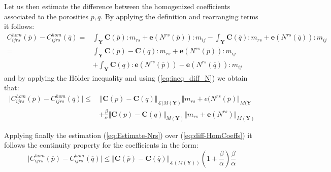 Let us then estimate the difference between the homogenized coefficients associated to the porosities $\overline{p},\overline{q}$. By applying the definition and rearranging terms it follows:
\begin{equation*}
    \begin{aligned}
        C^{hom}_{ijrs}(\overline{p}) - C^{hom}_{ijrs}(\overline{q}) = & \int_{\mathbf{Y}} \mathbf{C}(\overline{p}):m_{rs} + \mathbf{e}(N^{rs}(\overline{p})):m_{ij} - \int_{\mathbf{Y}} \mathbf{C}(\overline{q}):m_{rs} + \mathbf{e}(N^{rs}(\overline{q})):m_{ij}\\
        = & \int_{\mathbf{Y}} \mathbf{C}(\overline{p}) - \mathbf{C}(\overline{q}):m_{rs} + \mathbf{e}(N^{rs}(\overline{p})):m_{ij} \\
        & + \int_{\mathbf{Y}} \mathbf{C}(q):\mathbf{e}(N^{rs}(\overline{p})) - \mathbf{e}(N^{rs}(\overline{q})):m_{ij} 
    \end{aligned}
\end{equation*}
and by applying the H\"{o}lder inequality and using (\ref{eq:ineq_diff_N}) we obtain that:
\begin{equation}
    \label{eq:diff-HomCoeffs}
    \begin{aligned}
        \vert C^{hom}_{ijrs}(\overline{p}) - C^{hom}_{ijrs}(\overline{q})\vert \leq & \, \Vert \mathbf{C}(p)-\mathbf{C}(q) \Vert_{\mathcal{L}(M(\mathbf{Y})} \Vert m_{rs}+e(N^{rs}(\overline{p}) \Vert_{M(\mathbf{Y}} \\
         & +  \frac{\beta}{\alpha} \Vert \mathbf{C}(p)-\mathbf{C}(q) \Vert_{M(\mathbf{Y})} \Vert m_{rs}+\mathbf{e}(N^{rs}) \Vert_{M(\mathbf{Y})} 
    \end{aligned}
\end{equation}

Applying finally the estimation (\ref{eq:Estimate-Nrs}) over (\ref{eq:diff-HomCoeffs}) it follows the continuity property for the coefficients in the form:
\begin{equation}
    \label{ContinuityPropHom}
    \vert C^{hom}_{ijrs}(\overline{p}) - C^{hom}_{ijrs}(\overline{q})\vert \leq \Vert \mathbf{C}(\overline{p}) - \mathbf{C}(\overline{q}) \Vert_{\mathcal{L}(M(\mathbf{Y}))} (1+\frac{\beta}{\alpha})\frac{\beta}{\alpha}
\end{equation}

